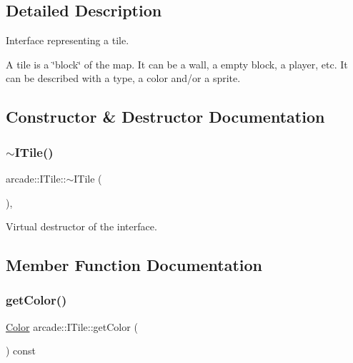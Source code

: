 \subsection{Detailed Description}
Interface representing a tile. 

A tile is a \char`\"{}block\char`\"{} of the map. It can be a wall, a empty block, a player, etc. It can be described with a type, a color and/or a sprite. 

\subsection{Constructor \& Destructor Documentation}
\mbox{\label{classarcade_1_1_i_tile_a45fb2120945fbddafb4b963d969a5b80}} 
\subsubsection{\texorpdfstring{$\sim$\+I\+Tile()}{~ITile()}}
{\footnotesize\ttfamily arcade\+::\+I\+Tile\+::$\sim$\+I\+Tile (\begin{DoxyParamCaption}{ }\end{DoxyParamCaption})\hspace{0.3cm}{\ttfamily [inline]}, {\ttfamily [virtual]}}



Virtual destructor of the interface. 



\subsection{Member Function Documentation}
\mbox{\label{classarcade_1_1_i_tile_adb20cb553bc2ce17dc23125eb70b8329}} 
\subsubsection{\texorpdfstring{get\+Color()}{getColor()}}
{\footnotesize\ttfamily \hyperlink{unionarcade_1_1_color}{Color} arcade\+::\+I\+Tile\+::get\+Color (\begin{DoxyParamCaption}{ }\end{DoxyParamCaption}) const\hspace{0.3cm}{\ttfamily [pure virtual]}}



